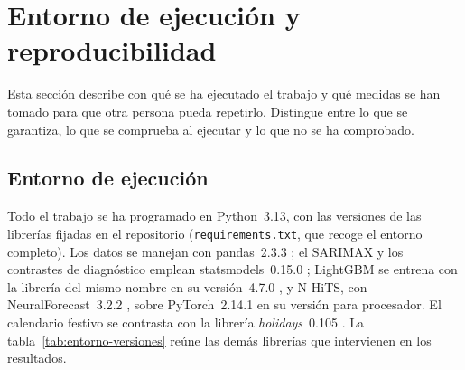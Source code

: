\section{Entorno de ejecución y reproducibilidad}\label{sec:entorno}

Esta sección describe con qué se ha ejecutado el trabajo y qué medidas se han
tomado para que otra persona pueda repetirlo. Distingue entre lo que se
garantiza, lo que se comprueba al ejecutar y lo que no se ha comprobado.

\subsection{Entorno de ejecución}\label{sec:entorno-software}

Todo el trabajo se ha programado en Python~3.13, con las versiones de las
librerías fijadas en el repositorio (\texttt{requirements.txt}, que recoge el
entorno completo). Los datos se manejan con
pandas~2.3.3 \parencite{mckinney2010data,pandas2025v233}; el SARIMAX y los
contrastes de diagnóstico emplean statsmodels~0.15.0
\parencite{seabold2010statsmodels}; LightGBM se entrena con la librería del
mismo nombre en su versión~4.7.0 \parencite{ke2017lightgbm}, y N-HiTS, con
NeuralForecast~3.2.2 \parencite{olivares2022neuralforecast}, sobre
PyTorch~2.14.1 en su versión para procesador. El calendario festivo se
contrasta con la librería \textit{holidays}~0.105 \parencite{holidays2026}. La
tabla~\ref{tab:entorno-versiones} reúne las demás librerías que intervienen en
los resultados.

